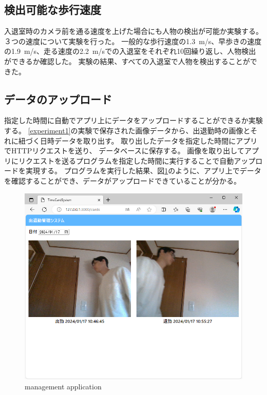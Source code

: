 \documentclass[10pt]{jarticle}
\begin{document}
    \subsection{検出可能な歩行速度}
    入退室時のカメラ前を通る速度を上げた場合にも人物の検出が可能か実験する。
    ３つの速度について実験を行った。
    一般的な歩行速度の1.3~m/s、早歩きの速度の1.9~m/s、走る速度の2.2~m/sでの入退室をそれぞれ10回繰り返し、人物検出ができるか確認した。 
    実験の結果、すべての入退室で人物を検出することができた。


    \subsection{データのアップロード}

指定した時間に自動でアプリ上にデータをアップロードすることができるか実験する。
\ref{experiment1}の実験で保存された画像データから、出退勤時の画像とそれに紐づく日時データを取り出す。
取り出したデータを指定した時間にアプリでHTTPリクエストを送り、
データベースに保存する。
画像を取り出してアプリにリクエストを送るプログラムを指定した時間に実行することで自動アップロードを実現する。
プログラムを実行した結果、図\ref{application}のように、アプリ上でデータを確認することができ、データがアップロードできていることが分かる。
\begin{figure}[!h]
    \centering
    \includegraphics[width=1.0\linewidth]{fig/application.png}
    \caption{management application}
    \label{application}
    \end{figure}
\end{document}
